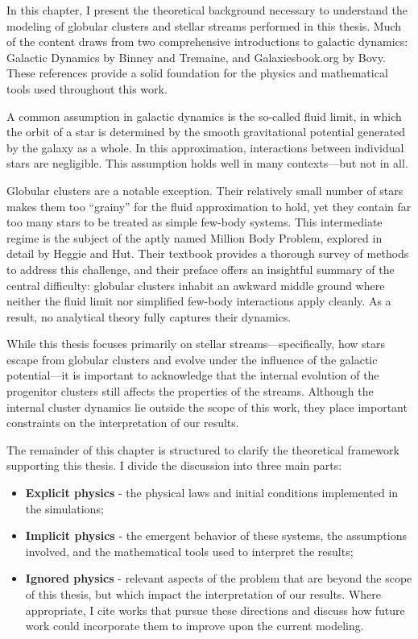 In this chapter, I present the theoretical background necessary to understand the modeling of globular clusters and stellar streams performed in this thesis. Much of the content draws from two comprehensive introductions to galactic dynamics: Galactic Dynamics by Binney and Tremaine, and Galaxiesbook.org by Bovy. These references provide a solid foundation for the physics and mathematical tools used throughout this work.

A common assumption in galactic dynamics is the so-called fluid limit, in which the orbit of a star is determined by the smooth gravitational potential generated by the galaxy as a whole. In this approximation, interactions between individual stars are negligible. This assumption holds well in many contexts—but not in all.

Globular clusters are a notable exception. Their relatively small number of stars makes them too “grainy” for the fluid approximation to hold, yet they contain far too many stars to be treated as simple few-body systems. This intermediate regime is the subject of the aptly named Million Body Problem, explored in detail by Heggie and Hut. Their textbook provides a thorough survey of methods to address this challenge, and their preface offers an insightful summary of the central difficulty: globular clusters inhabit an awkward middle ground where neither the fluid limit nor simplified few-body interactions apply cleanly. As a result, no analytical theory fully captures their dynamics.

While this thesis focuses primarily on stellar streams—specifically, how stars escape from globular clusters and evolve under the influence of the galactic potential—it is important to acknowledge that the internal evolution of the progenitor clusters still affects the properties of the streams. Although the internal cluster dynamics lie outside the scope of this work, they place important constraints on the interpretation of our results.

The remainder of this chapter is structured to clarify the theoretical framework supporting this thesis. I divide the discussion into three main parts:

\begin{itemize}

    \item \textbf{Explicit physics} - the physical laws and initial conditions implemented in the simulations;

    \item \textbf{Implicit physics} - the emergent behavior of these systems, the assumptions involved, and the mathematical tools used to interpret the results;

    \item \textbf{Ignored physics} - relevant aspects of the problem that are beyond the scope of this thesis, but which impact the interpretation of our results. Where appropriate, I cite works that pursue these directions and discuss how future work could incorporate them to improve upon the current modeling.

\end{itemize}




